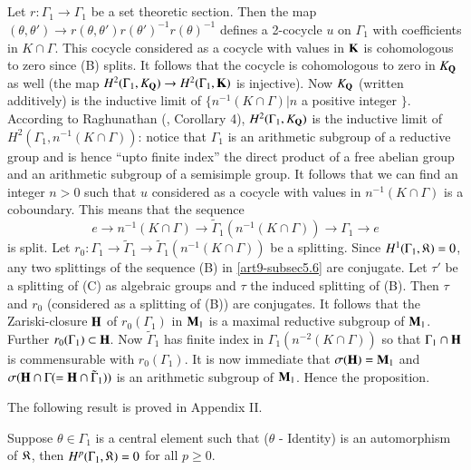 \subsection{}\label{art9-subsec5.8}
Let $r: \Gamma_1 \to \Gamma_1$ be a set theoretic section. Then the map $(\theta, \theta') \to r (\theta, \theta') r (\theta')^{-1} r (\theta)^{-1}$ defines a 2-cocycle $u$ on $\Gamma_1$ with coefficients in $K \cap \Gamma$. This cocycle considered as a cocycle with values in $\mathbf{K}$ is cohomologous to zero since (B) splits. It follows that the cocycle is cohomologous to zero in $K_{\mathbf{Q}}$ as well (the map $H^2 (\Gamma_1, K_{\mathbf{Q}}) \to H^2(\Gamma_1, \mathbf{K})$ is injective). Now $K_{\mathbf{Q}}$ (written additively) is the inductive limit of $\{n^{-1} (K \cap \Gamma) \big| n$ a positive integer $\}$. According to Raghunathan (\cite{art9-key3}, Corollary 4), $H^2 (\Gamma_1, K_{\mathbf{Q}})$ is the inductive limit of $H^2 (\Gamma_1, n^{-1} (K \cap \Gamma))$: notice that $\Gamma_1$ is an arithmetic subgroup of a reductive group and is hence ``upto finite index'' the direct product of a free abelian group and an arithmetic subgroup of a semisimple group. It follows that we can find an integer $n > 0$ such that $u$ considered as a cocycle with values in $n^{-1} (K \cap \Gamma)$ is a coboundary. This means that the sequence
$$
e \to n^{-1} (K \cap \Gamma) \to \tilde{\Gamma}_1 (n^{-1} (K \cap \Gamma)) \to \Gamma_1 \to e 
$$
is split. Let $r_0 : \Gamma_1 \to \tilde{\Gamma}_1 \to \tilde{\Gamma}_1 (n^{-1} (K \cap \Gamma))$ be a splitting. Since $H^1 (\Gamma_1, \mathfrak{K}) = 0$, any two splittings of the sequence (B) in \ref{art9-subsec5.6} are conjugate. Let $\tau'$ be a splitting of (C) as algebraic groups and $\tau$ the induced splitting of (B). Then $\tau$ and $r_0$ (considered as a splitting of (B)) are conjugates. It follows that the Zariski-closure $\mathbf{H}$ of $r_0 (\Gamma_1)$ in $\mathbf{M}_1$ is a maximal reductive subgroup of $\mathbf{M}_1$. Further $r_0 (\Gamma_1) \subset \mathbf{H}$. Now $\tilde{\Gamma}_1$ has finite index in $\Gamma_1 (n^{-2} (K \cap \Gamma))$ so that $\Gamma_1 \cap \mathbf{H}$ is commensurable with $r_0 (\Gamma_1).$ It is now immediate that $\sigma (\mathbf{H}) = \mathbf{M}_1$ and $\sigma (\mathbf{H} \cap \Gamma (= \mathbf{H} \cap \tilde{\Gamma}_1))$ is an arithmetic subgroup of $\mathbf{M}_1$. Hence the proposition.

The following result is proved in Appendix II.

\begin{lemma}\label{art9-lem5.9}
Suppose $\theta \in \Gamma_1$ is a central element such that ($\theta$ - Identity) is an automorphism of $\mathfrak{K}$, then $H^p (\Gamma_1, \mathfrak{K})=0$ for all $p\geqslant 0$.
\end{lemma}

